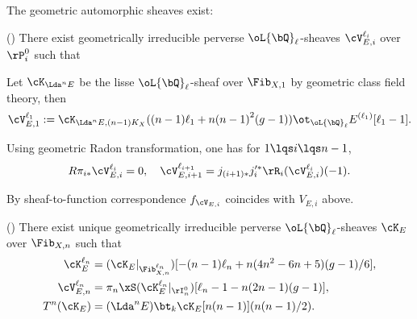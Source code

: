 \documentclass[article, a4paper, twoside]{universal}
\begin{document}
\begin{cnj}
	The geometric automorphic sheaves exist:

	(\cite[4.3.3]{Laumon1987Correspondance}) There exist geometrically irreducible perverse $\oL{\bQ}_{\ell}$-sheaves $\cV_{E,i}^{\ell_{i}}$ over $\rP_{i}^{0}$ such that
	\begin{itm}
		\item Let $\cK_{\Lda^{n}E}$ be the lisse $\oL{\bQ}_{\ell}$-sheaf over $\Fib_{X,1}$ by geometric class field theory, then
		\[
			\cV_{E,1}^{\ell_{1}}:=\cK_{\Lda^{n}E,(n-1)K_{X}}((n-1)\ell_{1}+n{(n-1)}^{2}(g-1))\ot_{\oL{\bQ}_{\ell}}E^{(\ell_{1})}[\ell_{1}-1].
		\]
		\item Using geometric Radon transformation, one has for $1\lqs i\lqs n-1$,
		\[
			R\pi_{i*}\cV_{E,i}^{\ell_{i}}=0,\quad \cV_{E,i+1}^{\ell_{i+1}}=j_{(i+1)*}j_{i}^{\prime*}\rR_{i}(\cV_{E,i}^{\ell_{i}})(-1).
		\]
		\item By sheaf-to-function correspondence $f_{\cV_{E,i}}$ coincides with $V_{E,i}$ above.
	\end{itm}

	(\cite[5.3.1]{Laumon1987Correspondance}) There exist unique geometrically irreducible perverse $\oL{\bQ}_{\ell}$-sheaves $\cK_{E}$ over $\Fib_{X,n}$ such that
	\begin{align*}
	  \cK_{E}^{\ell_{n}} &= (\cK_{E}|_{\Fib_{X,n}^{\ell_{n}}})[-(n-1)\ell_{n}+n(4n^{2}-6n+5)(g-1)/6],\\
	  \cV_{E,n}^{\ell_{n}} &= \pi_{n}\xS(\cK_{E}^{\ell_{n}}|_{\rI_{n}^{0}})[\ell_{n}-1-n(2n-1)(g-1)], \\
	  T^{n}(\cK_{E})&=(\Lda^{n}E)\bt_{k}\cK_{E}[n(n-1)](n(n-1)/2).
	\end{align*}
\end{cnj}


\printref
\end{document}
